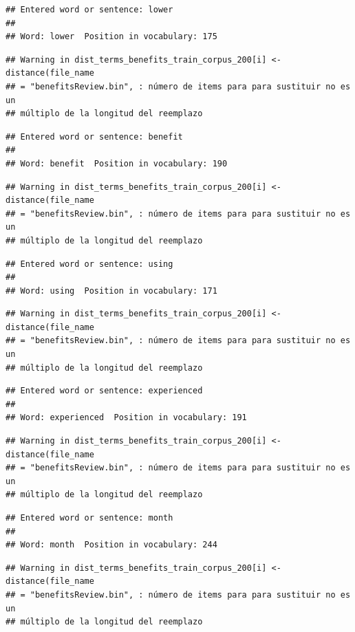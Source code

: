 \documentclass[spanish,]{article}
\begin{document}
\begin{verbatim}
## Entered word or sentence: lower
## 
## Word: lower  Position in vocabulary: 175
\end{verbatim}

\begin{verbatim}
## Warning in dist_terms_benefits_train_corpus_200[i] <- distance(file_name
## = "benefitsReview.bin", : número de items para para sustituir no es un
## múltiplo de la longitud del reemplazo
\end{verbatim}

\begin{verbatim}
## Entered word or sentence: benefit
## 
## Word: benefit  Position in vocabulary: 190
\end{verbatim}

\begin{verbatim}
## Warning in dist_terms_benefits_train_corpus_200[i] <- distance(file_name
## = "benefitsReview.bin", : número de items para para sustituir no es un
## múltiplo de la longitud del reemplazo
\end{verbatim}

\begin{verbatim}
## Entered word or sentence: using
## 
## Word: using  Position in vocabulary: 171
\end{verbatim}

\begin{verbatim}
## Warning in dist_terms_benefits_train_corpus_200[i] <- distance(file_name
## = "benefitsReview.bin", : número de items para para sustituir no es un
## múltiplo de la longitud del reemplazo
\end{verbatim}

\begin{verbatim}
## Entered word or sentence: experienced
## 
## Word: experienced  Position in vocabulary: 191
\end{verbatim}

\begin{verbatim}
## Warning in dist_terms_benefits_train_corpus_200[i] <- distance(file_name
## = "benefitsReview.bin", : número de items para para sustituir no es un
## múltiplo de la longitud del reemplazo
\end{verbatim}

\begin{verbatim}
## Entered word or sentence: month
## 
## Word: month  Position in vocabulary: 244
\end{verbatim}

\begin{verbatim}
## Warning in dist_terms_benefits_train_corpus_200[i] <- distance(file_name
## = "benefitsReview.bin", : número de items para para sustituir no es un
## múltiplo de la longitud del reemplazo
\end{verbatim}
\end{document}
